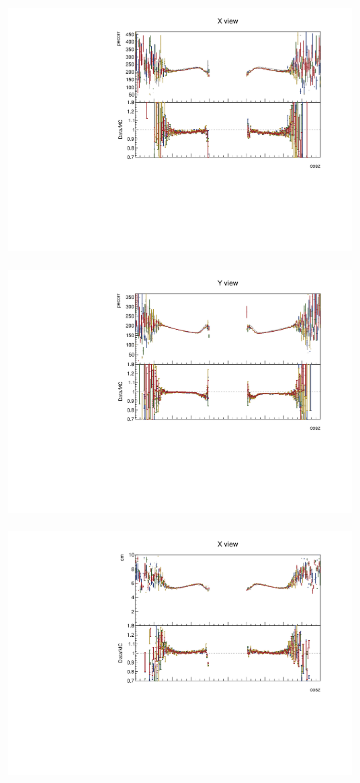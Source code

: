 \documentclass[12pt,a4paper]{article}
\begin{document}
\begin{figure}[h!]
\begin{subfigure}{0.5\textwidth}
  \end{subfigure}
  \begin{subfigure}{0.5\textwidth}
    \includegraphics[width=\linewidth]{PlotsAngularDistribution/pecorr_cosz_x.pdf}
  \end{subfigure}
  \begin{subfigure}{0.5\textwidth}
    \includegraphics[width=\linewidth]{PlotsAngularDistribution/pecorr_cosz_y.pdf}
  \end{subfigure}
  \begin{subfigure}{0.5\textwidth}
    \includegraphics[width=\linewidth]{PlotsAngularDistribution/cm_cosz_x.pdf}

\end{subfigure}
\end{figure}
\end{document}
